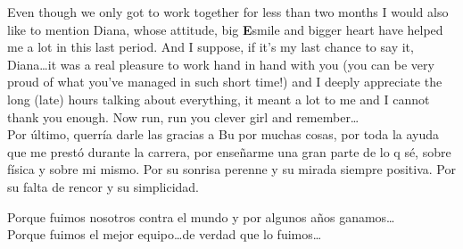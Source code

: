 Even though we only got to work together for less than two months I would also like to mention Diana, whose attitude, big {\bf E}smile and bigger heart have helped me a lot in this last period.
And I suppose, if it's my last chance to say it, Diana\dots it was a real pleasure to work hand in hand with you (you can be very proud of what you've managed in such short time!) and I deeply appreciate the long (late) hours talking about everything, it meant a lot to me and I cannot thank you enough. Now run, run you clever girl and remember\dots\\



Por último, querría darle las gracias a Bu por muchas cosas, por toda la ayuda que me prestó durante la carrera, por enseñarme una gran parte de lo q sé, sobre física y sobre mi mismo. Por su sonrisa perenne y su mirada siempre positiva. Por su falta de rencor y su simplicidad.

Porque fuimos nosotros contra el mundo y por algunos años ganamos\dots\\
Porque fuimos el mejor equipo\dots de verdad que lo fuimos\dots
